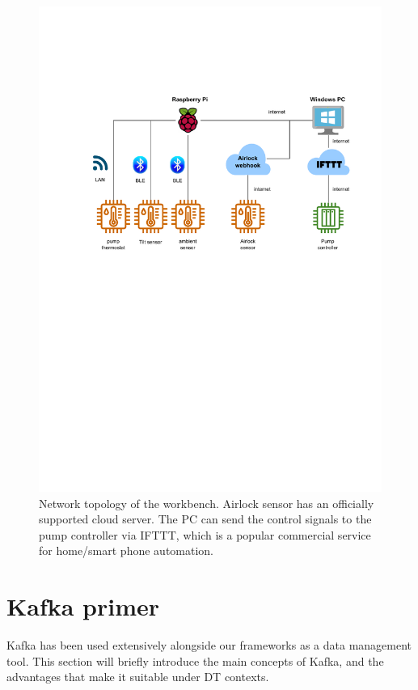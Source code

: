 \begin{figure}[hbt!]
  \centering
  \includegraphics[scale=0.65]{figures/workbench_map.pdf}
  \caption[Network topology of the workbench]{Network topology of the workbench. Airlock sensor has an officially supported cloud server. The PC can send the control signals to the pump controller via IFTTT, which is a popular commercial service for home/smart phone automation.}
  \label{fig:workbench_map}
\end{figure}

\chapter{Kafka primer} \label{apd:kafka}
Kafka has been used extensively alongside our frameworks as a data management tool. This section will briefly introduce the main concepts of Kafka, and the advantages that make it suitable under DT contexts.

